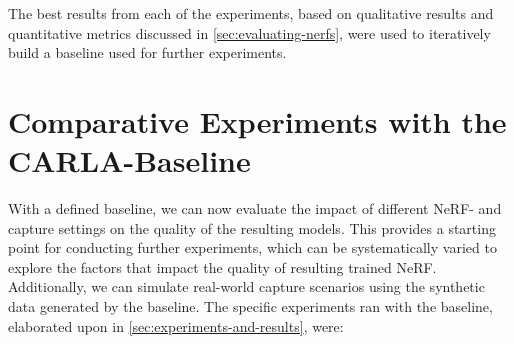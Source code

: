 The best results from each of the experiments, based on qualitative results and quantitative metrics discussed in \autoref{sec:evaluating-nerfs}, were used to iteratively build a baseline used for further experiments.
















\section{Comparative Experiments with the CARLA-Baseline}
\begin{comment}
Premise: Have a CARLA-baseline for further experiments
Question: Which further experiments should I conduct?

\begin{itemize}
    \item Find the efficiency of pose refinement
\end{itemize}
\end{comment}

With a defined baseline, we can now evaluate the impact of different NeRF- and capture settings on the quality of the resulting models. This provides a starting point for conducting further experiments, which can be systematically varied to explore the factors that impact the quality of resulting trained NeRF. Additionally, we can simulate real-world capture scenarios using the synthetic data generated by the baseline. The specific experiments ran with the baseline, elaborated upon in \autoref{sec:experiments-and-results}, were:

